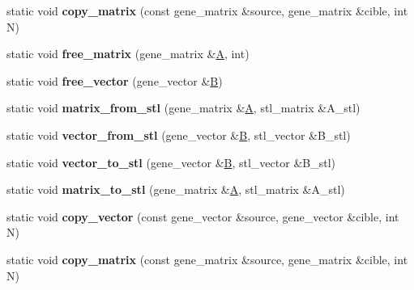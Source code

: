 \begin{DoxyCompactItemize}
\item 
\mbox{\label{classc__interface__base_ae1088de54710b3fe1c96f3b153fcbd7a}} 
static void {\bfseries copy\+\_\+matrix} (const gene\+\_\+matrix \&source, gene\+\_\+matrix \&cible, int N)
\item 
\mbox{\label{classc__interface__base_a532c91e4f11ab3f9067e7cf025c5357a}} 
static void {\bfseries free\+\_\+matrix} (gene\+\_\+matrix \&\hyperlink{group___core___module_class_eigen_1_1_matrix}{A}, int)
\item 
\mbox{\label{classc__interface__base_a06140c96a34c5d30271f7a6e1996eb85}} 
static void {\bfseries free\+\_\+vector} (gene\+\_\+vector \&\hyperlink{group___core___module_class_eigen_1_1_matrix}{B})
\item 
\mbox{\label{classc__interface__base_a9e5382709257a4a2522db1f6e66595f1}} 
static void {\bfseries matrix\+\_\+from\+\_\+stl} (gene\+\_\+matrix \&\hyperlink{group___core___module_class_eigen_1_1_matrix}{A}, stl\+\_\+matrix \&A\+\_\+stl)
\item 
\mbox{\label{classc__interface__base_a41c8375c68100638566bff514f757a0b}} 
static void {\bfseries vector\+\_\+from\+\_\+stl} (gene\+\_\+vector \&\hyperlink{group___core___module_class_eigen_1_1_matrix}{B}, stl\+\_\+vector \&B\+\_\+stl)
\item 
\mbox{\label{classc__interface__base_a6fe93f6f00b676d683d75cb9c92170e0}} 
static void {\bfseries vector\+\_\+to\+\_\+stl} (gene\+\_\+vector \&\hyperlink{group___core___module_class_eigen_1_1_matrix}{B}, stl\+\_\+vector \&B\+\_\+stl)
\item 
\mbox{\label{classc__interface__base_ad0930956d9c07cc1babd2f3f26b22e5a}} 
static void {\bfseries matrix\+\_\+to\+\_\+stl} (gene\+\_\+matrix \&\hyperlink{group___core___module_class_eigen_1_1_matrix}{A}, stl\+\_\+matrix \&A\+\_\+stl)
\item 
\mbox{\label{classc__interface__base_a6afc700b46835b233d3a10c01055a585}} 
static void {\bfseries copy\+\_\+vector} (const gene\+\_\+vector \&source, gene\+\_\+vector \&cible, int N)
\item 
\mbox{\label{classc__interface__base_ae1088de54710b3fe1c96f3b153fcbd7a}} 
static void {\bfseries copy\+\_\+matrix} (const gene\+\_\+matrix \&source, gene\+\_\+matrix \&cible, int N)
\end{DoxyCompactItemize}


